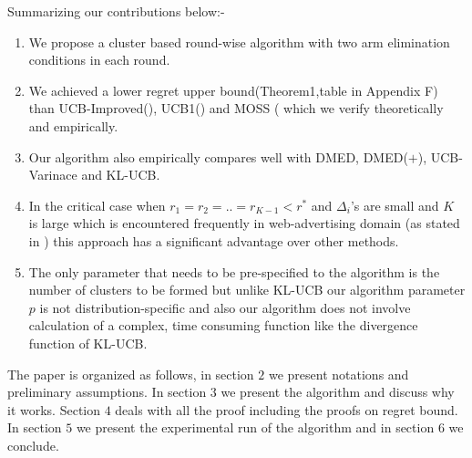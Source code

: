 	Summarizing our contributions below:-
\begin{enumerate}
\item We propose a cluster based round-wise algorithm with two arm elimination conditions in each round.
\item We achieved a lower regret upper bound(Theorem1,table in Appendix F) than UCB-Improved(\cite{auer2010ucb}), UCB1(\cite{auer2002finite}) and MOSS (\cite{audibert2009minimax} which we verify theoretically and empirically.
\item Our algorithm also empirically compares well with DMED, DMED($+$), UCB-Varinace and KL-UCB.
\item In the critical case when $r_{1}=r_{2}=..=r_{K-1}<r^{*}$ and $\Delta_{i}$'s are small and $K$ is large which is encountered frequently in web-advertising domain (as stated in \cite{garivier2011kl}) this approach has a significant advantage over other methods.
\item The only parameter that needs to be pre-specified to the algorithm is the number of clusters to be formed but unlike KL-UCB our algorithm parameter $p$ is not distribution-specific and also our algorithm does not involve calculation of a complex, time consuming function like the divergence function of KL-UCB.
\end{enumerate}
	
	The paper is organized as follows, in section $2$ we present notations and preliminary assumptions. In section $3$ we present the algorithm and discuss why it works. Section $4$ deals with all the proof including the proofs on regret bound. In section $5$ we present the experimental run of the algorithm and in section $6$ we conclude. 
